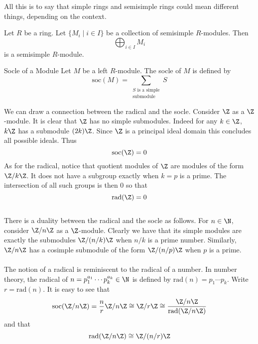 \documentclass[a4paper]{article}
\begin{document}
All this is to say that simple rings and semisimple rings could mean different things, depending on the context. 

\begin{prp}{}{} Let $R$ be a ring. Let $\{M_i\;|\;i\in I\}$ be a collection of semisimple $R$-modules. Then $$\bigoplus_{i\in I}M_i$$ is a semisimple $R$-module. 
\end{prp}

\begin{defn}{Socle of a Module}{} Let $M$ be a left $R$-module. The socle of $M$ is defined by $$\text{soc}(M)=\sum_{\substack{S\text{ is a simple}\\\text{submodule}}}S$$
\end{defn}

We can draw a connection between the radical and the socle. Consider $\Z$ as a $\Z$-module. It is clear that $\Z$ has no simple submodules. Indeed for any $k\in\Z$, $k\Z$ has a submodule $(2k)\Z$. Since $\Z$ is a principal ideal domain this concludes all possible ideals. Thus $$\text{soc}(\Z)=0$$ As for the radical, notice that quotient modules of $\Z$ are modules of the form $\Z/k\Z$. It does not have a subgroup exactly when $k=p$ is a prime. The intersection of all such groups is then $0$ so that $$\text{rad}(\Z)=0$$~\\

There is a duality between the radical and the socle as follows. For $n\in\N$, consider $\Z/n\Z$ as a $\Z$-module. Clearly we have that its simple modules are exactly the submodules $\Z/(n/k)\Z$ when $n/k$ is a prime number. Similarly, $\Z/n\Z$ has a cosimple submodule of the form $\Z/(n/p)\Z$ when $p$ is a prime. \\~\\

The notion of a radical is reminiscent to the radical of a number. In number theory, the radical of $n=p_1^{a_1}\cdots p_k^{a_k}\in\N$ is defined by $\text{rad}(n)=p_1\cdots p_k$. Write $r=\text{rad}(n)$. It is easy to see that $$\text{soc}(\Z/n\Z)=\frac{n}{r}\Z/n\Z\cong\Z/r\Z\cong\frac{\Z/n\Z}{\text{rad}(\Z/n\Z)}$$ and that $$\text{rad}(\Z/n\Z)\cong\Z/(n/r)\Z$$
\end{document}
